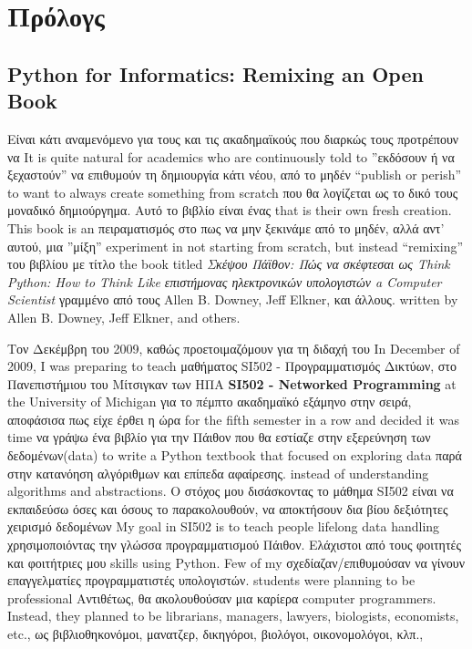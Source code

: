 
\chapter{Πρόλογς}

\section*{Python for Informatics: Remixing an Open Book}

Είναι κάτι αναμενόμενο για τους και τις ακαδημαϊκούς που διαρκώς τους προτρέπουν να
It is quite natural for academics who are continuously told to 
''εκδόσουν ή να ξεχαστούν'' να επιθυμούν τη δημιουργία κάτι νέου, από το μηδέν
``publish or perish'' to want to always create something from scratch
που θα λογίζεται ως το δικό τους μοναδικό δημιούργημα. Αυτό το βιβλίο είναι ένας 
that is their own fresh creation.   This book is an 
πειραματισμός στο πως να μην ξεκινάμε από το μηδέν, αλλά αντ' αυτού, μια ''μίξη''
experiment in not starting from scratch, but instead ``remixing''
του βιβλίου με τίτλο
the book titled
\emph{Σκέψου Πάϊθον: Πώς να σκέφτεσαι ως Think Python: How to Think Like
επιστήμονας ηλεκτρονικών υπολογιστών a Computer Scientist}
γραμμένο από τους Allen B. Downey, Jeff Elkner, και άλλους.
written by Allen B. Downey, Jeff Elkner, and others.

Τον Δεκέμβρη του 2009, καθώς προετοιμαζόμουν για τη διδαχή του  
In December of 2009, I was preparing to teach
μαθήματος SI502 - Προγραμματισμός Δικτύων, στο Πανεπιστήμιου του Μίτσιγκαν των ΗΠΑ
{\bf SI502 - Networked Programming} at the University of Michigan
για το πέμπτο ακαδημαϊκό εξάμηνο στην σειρά, αποφάσισα πως είχε έρθει η ώρα
for the fifth semester in a row and decided it was time
να γράψω ένα βιβλίο για την Πάιθον που θα εστίαζε στην εξερεύνηση των δεδομένων(data)
to write a Python textbook that focused on exploring data
παρά στην κατανόηση αλγόριθμων και επίπεδα αφαίρεσης.
instead of understanding algorithms and abstractions.
Ο στόχος μου δισάσκοντας το μάθημα SI502 είναι να εκπαιδεύσω όσες και όσους το παρακολουθούν, να αποκτήσουν δια βίου δεξιότητες χειρισμό δεδομένων 
My goal in SI502 is to teach people lifelong data handling 
χρησιμοποιόντας την γλώσσα προγραμματισμού Πάιθον. Ελάχιστοι από τους φοιτητές και φοιτήτριες μου 
skills using Python.  Few of my
σχεδίαζαν/επιθυμούσαν να γίνουν επαγγελματίες προγραμματιστές υπολογιστών.
students were planning to be professional 
Αντιθέτως, θα ακολουθούσαν μια καρίερα
computer programmers.  Instead, they
planned to be librarians, managers, lawyers, biologists, economists, etc., 
ως βιβλιοθηκονόμοι, μανατζερ, δικηγόροι, βιολόγοι, οικονομολόγοι, κλπ., 

